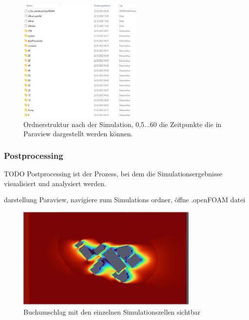 \begin{figure}
    \centering
    \includegraphics[width=0.55\textwidth]{papers/openfoam/Bilder/Ordnerstruktur_Simuliert.jpg}
    \caption{Ordnerstruktur nach der Simulation, 0,5...60 die Zeitpunkte die in Paraview dargestellt werden können.}
    \label{fig:ordStrktSim}
\end{figure}


\subsubsection{Postprocessing}
TODO
Postprocessing ist der Prozess, bei dem die Simulationsergebnisse visualisiert und analysiert werden. 

darstellung
 Paraview, navigiere zum Simulations ordner, öffne .openFOAM datei


\begin{figure}
    \centering
    \includegraphics[width=0.8\textwidth]{papers/openfoam/Bilder/vorschlag_Wind_Westen_10m_blocky.png}
    \caption{Buchumschlag mit den einzelnen Simulationszellen sichtbar}
    \label{fig:vorschWindWestBlocky}
\end{figure}
